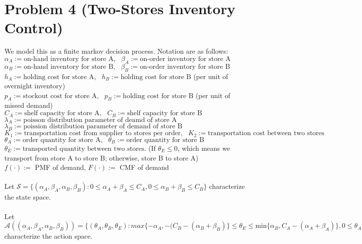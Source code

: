\documentclass{article}
\begin{document}
\section*{Problem 4 (Two-Stores Inventory Control)}
We model this as a finite markov decision process. Notation are as follows:\\
$\alpha_{A}:=\text{on-hand inventory for store A},\text{ } \beta_{A}:=\text{on-order inventory for store A}$\\
$\alpha_{B}:=\text{on-hand inventory for store B},\text{ } \beta_{B}:=\text{on-order inventory for store B}$\\
$h_{A}:=\text{holding cost for store A},\text{ } h_{B}:=\text{holding cost for store B}$ (per unit of overnight inventory)\\
$p_{A}:=\text{stockout cost for store A},\text{ } p_{B}:=\text{holding cost for store B}$ (per unit of missed demand)\\
$C_{A}:=\text{shelf capacity for store A},\text{ } C_{B}:=\text{shelf capacity for store B}$\\
$\lambda_{A}:=\text{poisson distribution parameter of deamd of store A}$ \\
$\lambda_{B}:=\text{poission distribution parameter of demand of store B}$\\
$K_{1}:=\text{transportation cost from supplier to stores per order},\text{ } K_{2}:=\text{transportation cost between two stores}$\\
$\theta_{A}:=\text{order quantity for store A},\text{ } \theta_{B}:=\text{order quantity for store B}$ \\
$\theta_{E}:=\text{transported quantity between two stores.}$ (If $\theta_{E} \leq 0$, which means we transport from store A to store B; otherwise, store B to store A)\\
$f(\cdot):=$ PMF of demand, $F(\cdot):=$ CMF of demand\\ \\
Let $\mathcal{S}=\{(\alpha_{A}, \beta_{A},\alpha_{B}, \beta_{B}) : 0 \leq \alpha_{A}+\beta_{A} \leq C_{A},0 \leq \alpha_{B}+\beta_{B} \leq C_{B} \}$ characterize the state space.\\ \\
Let $\mathcal{A}((\alpha_{A}, \beta_{A}, \alpha_{B}, \beta_{B}))=\{(\theta_{A}, \theta_{B}, \theta_{E}): max\{-\alpha_{A}, -(C_{B}-(\alpha_{B}+\beta_{B})\} \leq \theta_{E} \leq \text{min} \{\alpha_{B},C_{A}-(\alpha_{A}+\beta_{A}) \}, 0 \leq \theta_{A} \leq C_{A}-(\alpha_{A}+\beta_{A}+\theta_{E}), 0 \leq \theta_{B} \leq C_{B}-(\alpha_{B}+\beta_{B}-\theta_{E})\}$ characterize the action space.\\
\end{document}
